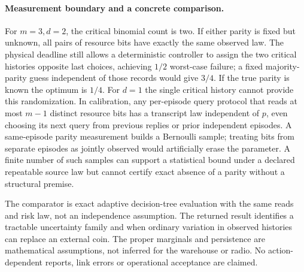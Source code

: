 \documentclass[11pt]{article}
\begin{document}
\paragraph{Measurement boundary and a concrete comparison.}
For $m=3,d=2$, the critical binomial count is two. If either parity is fixed but unknown, all pairs of resource bits have exactly the same observed law. The physical deadline still allows a deterministic controller to assign the two critical histories opposite last choices, achieving $1/2$ worst-case failure; a fixed majority-parity guess independent of those records would give $3/4$. If the true parity is known the optimum is $1/4$. For $d=1$ the single critical history cannot provide this randomization. In calibration, any per-episode query protocol that reads at most $m-1$ distinct resource bits has a transcript law independent of $p$, even choosing its next query from previous replies or prior independent episodes. A same-episode parity measurement builds a Bernoulli sample; treating bits from separate episodes as jointly observed would artificially erase the parameter. A finite number of such samples can support a statistical bound under a declared repeatable source law but cannot certify exact absence of a parity without a structural premise.

The comparator is exact adaptive decision-tree evaluation with the same reads and risk law, not an independence assumption. The returned result identifies a tractable uncertainty family and when ordinary variation in observed histories can replace an external coin. The proper marginals and persistence are mathematical assumptions, not inferred for the warehouse or radio. No action-dependent reports, link errors or operational acceptance are claimed.
\end{document}
